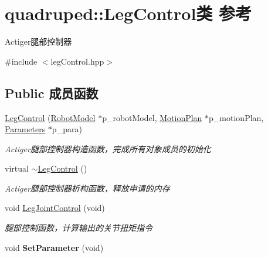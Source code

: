 \hypertarget{classquadruped_1_1LegControl}{}\section{quadruped\+:\+:Leg\+Control类 参考}
\label{classquadruped_1_1LegControl}


Actiger腿部控制器  




{\ttfamily \#include $<$leg\+Control.\+hpp$>$}

\subsection*{Public 成员函数}
\begin{DoxyCompactItemize}
\item 
\hyperlink{classquadruped_1_1LegControl_a65fe75308c2c86983d286fda86fe941e}{Leg\+Control} (\hyperlink{classquadruped_1_1RobotModel}{Robot\+Model} $\ast$p\+\_\+robot\+Model, \hyperlink{classquadruped_1_1MotionPlan}{Motion\+Plan} $\ast$p\+\_\+motion\+Plan, \hyperlink{classquadruped_1_1Parameters}{Parameters} $\ast$p\+\_\+para)
\begin{DoxyCompactList}\small\item\em Actiger腿部控制器构造函数，完成所有对象成员的初始化 \end{DoxyCompactList}\item 
\mbox{\label{classquadruped_1_1LegControl_add4f87d860875a9800dc8862bd047c8e}} 
virtual \hyperlink{classquadruped_1_1LegControl_add4f87d860875a9800dc8862bd047c8e}{$\sim$\+Leg\+Control} ()
\begin{DoxyCompactList}\small\item\em Actiger腿部控制器析构函数，释放申请的内存 \end{DoxyCompactList}\item 
\mbox{\label{classquadruped_1_1LegControl_ae330698af9fc8f7fc2451d76171a18ca}} 
void \hyperlink{classquadruped_1_1LegControl_ae330698af9fc8f7fc2451d76171a18ca}{Leg\+Joint\+Control} (void)
\begin{DoxyCompactList}\small\item\em 腿部控制函数，计算输出的关节扭矩指令 \end{DoxyCompactList}\item 
\mbox{\label{classquadruped_1_1LegControl_aad890caeb58930071a0e23217f897a94}} 
void {\bfseries Set\+Parameter} (void)
\end{DoxyCompactItemize}
